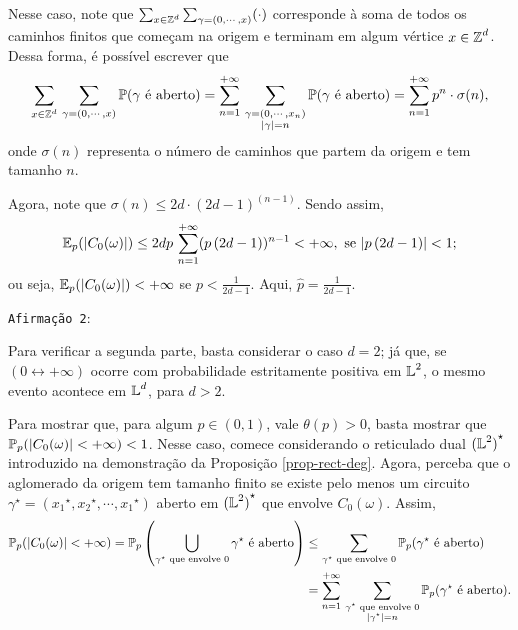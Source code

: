 \par Nesse caso, note que $\sum_{x \in \operatorname{\mathbb{Z}}^d}\sum_{\gamma = (0, \cdots, x)}(\cdot)$ corresponde à soma de todos os caminhos finitos que começam na origem e terminam em algum vértice $x \in \operatorname{\mathbb{Z}}^d$. Dessa forma, é possível escrever que
\begin{align*}
	\sum_{x \in \operatorname{\mathbb{Z}}^d}\,\sum_{\gamma = (0, \cdots, x)}\operatorname{\mathbb{P}}(\gamma \text{ é aberto}) = \sum_{n =1}^{+\infty}\,\sum_{\substack{\gamma = (0, \cdots, x_n) \\ |\gamma| = n}} \operatorname{\mathbb{P}}(\gamma \text{ é aberto}) = \sum_{n =1}^{+\infty} p^n \cdot \sigma(n),
\end{align*}
onde $\sigma(n)$ representa o número de caminhos que partem da origem e tem tamanho $n$. 

\par Agora, note que $\sigma(n) \leq 2d \cdot (2d - 1)^{(n-1)}$. Sendo assim,
\begin{align*}
	\operatorname{\mathbb{E}}_p(|C_0(\omega)|) \leq 2dp \, \sum_{n = 1}^{+\infty} (p \, (2d-1))^{n-1} < +\infty, \text{ se } |p\,(2d-1)| < 1;
\end{align*}
ou seja, $\operatorname{\mathbb{E}}_p(|C_0(\omega)|) < +\infty$ se $p < \frac{1}{2d - 1}$. Aqui, $\hat{p} = \frac{1}{2d - 1}$.

\par \texttt{Afirmação 2}:

\par Para verificar a segunda parte, basta considerar o caso $d = 2$; já que, se $(0 \leftrightarrow +\infty)$ ocorre com probabilidade estritamente positiva em $\operatorname{\mathbb{L}}^2$, o mesmo evento acontece em $\operatorname{\mathbb{L}}^d$, para $d > 2$.

\par Para mostrar que, para algum $p \in (0, 1)$, vale $\theta(p) > 0$, basta mostrar que $\operatorname{\mathbb{P}}_p(|C_0(\omega)| < +\infty) < 1$. Nesse caso, comece considerando o reticulado dual ${(\operatorname{\mathbb{L}}^2)}^{\star}$ introduzido na demonstração da Proposição \ref{prop-rect-deg}. Agora, perceba que o aglomerado da origem tem tamanho finito se existe pelo menos um circuito $\gamma^{\star} = ({x_1}^{\star}, {x_2}^{\star}, \cdots, {x_1}^{\star})$ aberto em ${(\operatorname{\mathbb{L}}^2)}^{\star}$ que envolve $C_0(\omega)$. Assim,
\begin{align*}
	\operatorname{\mathbb{P}}_p(|C_0(\omega)| < +\infty) = \operatorname{\mathbb{P}}_p\left(\bigcup_{\gamma^{\star} \text{ que envolve } 0} \gamma^{\star} \text{ é aberto}\right) &\leq \sum_{\gamma^{\star} \text{ que envolve } 0} \operatorname{\mathbb{P}}_p(\gamma^{\star} \text{ é aberto}) \\
	& = \sum_{n = 1}^{+\infty} \, \sum_{\substack{\gamma^{\star} \text{ que envolve } 0 \\ |\gamma^{\star}| = n}} \operatorname{\mathbb{P}}_p(\gamma^{\star} \text{ é aberto}).
\end{align*}

